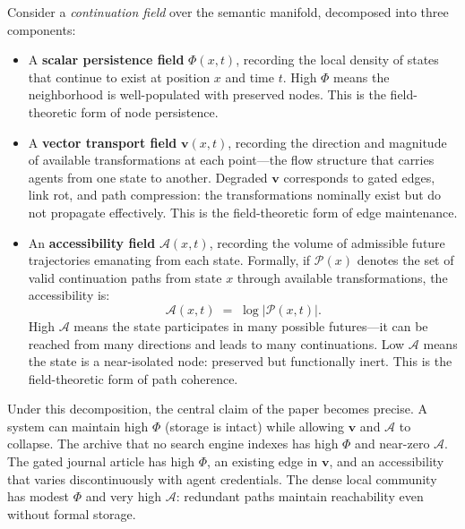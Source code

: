 \documentclass[12pt]{article}
\begin{document}
Consider a \emph{continuation field} over the semantic manifold, decomposed
into three components:

\begin{itemize}[leftmargin=2em,itemsep=0.3em]
  \item A \textbf{scalar persistence field} $\Phi(x,t)$, recording the
        local density of states that continue to exist at position $x$
        and time $t$.
        High $\Phi$ means the neighborhood is well-populated with
        preserved nodes.
        This is the field-theoretic form of node persistence.

  \item A \textbf{vector transport field} $\mathbf{v}(x,t)$, recording
        the direction and magnitude of available transformations at each
        point---the flow structure that carries agents from one state
        to another.
        Degraded $\mathbf{v}$ corresponds to gated edges, link rot, and
        path compression: the transformations nominally exist but do not
        propagate effectively.
        This is the field-theoretic form of edge maintenance.

  \item An \textbf{accessibility field} $\mathcal{A}(x,t)$, recording
        the volume of admissible future trajectories emanating from
        each state.
        Formally, if $\mathcal{P}(x)$ denotes the set of valid continuation
        paths from state $x$ through available transformations, the
        accessibility is:
        \[
          \mathcal{A}(x,t) \;=\; \log \lvert \mathcal{P}(x,t) \rvert.
        \]
        High $\mathcal{A}$ means the state participates in many possible
        futures---it can be reached from many directions and leads to many
        continuations.
        Low $\mathcal{A}$ means the state is a near-isolated node: preserved
        but functionally inert.
        This is the field-theoretic form of path coherence.
\end{itemize}

Under this decomposition, the central claim of the paper becomes precise.
A system can maintain high $\Phi$ (storage is intact) while allowing
$\mathbf{v}$ and $\mathcal{A}$ to collapse.
The archive that no search engine indexes has high $\Phi$ and
near-zero $\mathcal{A}$.
The gated journal article has high $\Phi$, an existing edge in $\mathbf{v}$,
and an accessibility that varies discontinuously with agent credentials.
The dense local community has modest $\Phi$ and very high $\mathcal{A}$:
redundant paths maintain reachability even without formal storage.
\end{document}
